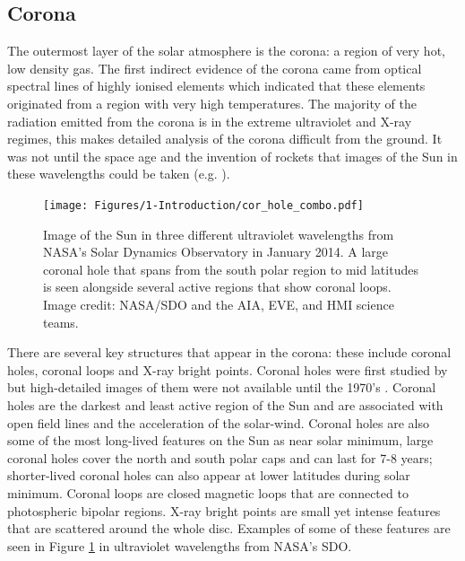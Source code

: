 \subsection{Corona}
The outermost layer of the solar atmosphere is the corona: a region of very hot, low density gas. The first indirect evidence of the corona came from optical spectral lines of highly ionised elements \citep{Grotrian_1939} which indicated that these elements originated from a region with very high temperatures. The majority of the radiation emitted from the corona is in the extreme ultraviolet and X-ray regimes, this makes detailed analysis of the corona difficult from the ground. It was not until the space age and the invention of rockets that images of the Sun in these wavelengths could be taken (e.g. \citealt{van_Speybroeck_etal_1970}).


\begin{figure}
    \centering
    \texttt{[image: Figures/1-Introduction/cor\_hole\_combo.pdf]}
    \caption[UV image of Sun showing coronal features]{Image of the Sun in three different ultraviolet wavelengths from NASA's Solar Dynamics Observatory in January 2014. A large coronal hole that spans from the south polar region to mid latitudes is seen alongside several active regions that show coronal loops. Image credit: NASA/SDO and the AIA, EVE, and HMI science teams.}
    \label{fig:corona_structure}
\end{figure}

There are several key structures that appear in the corona: these include coronal holes, coronal loops and X-ray bright points. Coronal holes were first studied by \citet{Waldmeier_1956} but high-detailed images of them were not available until the 1970's \citep{Huber_etal_1974}. Coronal holes are the darkest and least active region of the Sun and are associated with open field lines and the acceleration of the solar-wind. Coronal holes are also some of the most long-lived features on the Sun as near solar minimum, large coronal holes cover the north and south polar caps and can last for 7-8 years; shorter-lived coronal holes can also appear at lower latitudes during solar minimum. Coronal loops are closed magnetic loops that are connected to photospheric bipolar regions. X-ray bright points are small yet intense features that are scattered around the whole disc. Examples of some of these features are seen in Figure \ref{fig:corona_structure} in ultraviolet wavelengths from NASA's SDO.

